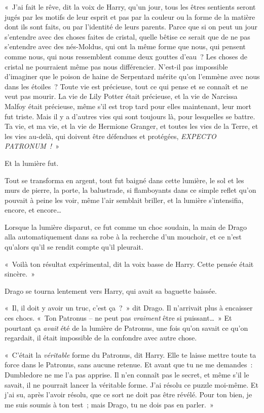 «~J'ai fait le rêve, dit la voix de Harry, qu'un jour, tous les êtres sentients\footnotemark{} seront jugés par les motifs de leur esprit et pas par la couleur ou la forme de la matière dont ils sont faits, ou par l'identité de leurs parents.
Parce que si on peut un jour s'entendre avec des choses faites de cristal, quelle bêtise ce serait que de ne pas s'entendre avec des nés-Moldus, qui ont la même forme que nous, qui pensent comme nous, qui nous ressemblent comme deux gouttes d'eau~?
Les choses de cristal ne pourraient même pas nous différencier.
N'est-il pas impossible d'imaginer que le poison de haine de Serpentard mérite qu'on l'emmène avec nous dans les étoiles~?
Toute vie est précieuse, tout ce qui pense et se connaît et ne veut pas mourir.
La vie de Lily Potter était précieuse, et la vie de Narcissa Malfoy était précieuse, même s'il est trop tard pour elles maintenant, leur mort fut triste.
Mais il y a d'autres vies qui sont toujours là, pour lesquelles se battre.
Ta vie, et ma vie, et la vie de Hermione Granger, et toutes les vies de la Terre, et les vies au-delà, qui doivent être défendues et protégées, \emph{EXPECTO PATRONUM~!}~»

Et la lumière fut.

Tout se transforma en argent, tout fut baigné dans cette lumière, le sol et les murs de pierre, la porte, la balustrade, si flamboyants dans ce simple reflet qu'on pouvait à peine les voir, même l'air semblait briller, et la lumière s'intensifia, encore, et encore…

Lorsque la lumière disparut, ce fut comme un choc soudain, la main de Drago alla automatiquement dans sa robe à la recherche d'un mouchoir, et ce n'est qu'alors qu'il se rendit compte qu'il pleurait.

«~Voilà ton résultat expérimental, dit la voix basse de Harry.
Cette pensée était sincère.~»

Drago se tourna lentement vers Harry, qui avait sa baguette baissée.

«~Il, il doit y avoir un truc, c'est ça~?~»
dit Drago.
Il n'arrivait plus à encaisser ces chocs.
«~Ton Patronus -- ne peut pas \emph{vraiment} être si puissant…~»
Et pourtant ça \emph{avait} été de la lumière de Patronus, une fois qu'on savait ce qu'on regardait, il était impossible de la confondre avec autre chose.

«~C'était la \emph{véritable} forme du Patronus, dit Harry.
Elle te laisse mettre toute ta force dans le Patronus, sans aucune retenue.
Et avant que tu ne me demandes~: Dumbledore ne me l'a pas apprise.
Il n'en connaît pas le secret, et même s'il le savait, il ne pourrait lancer la véritable forme.
J'ai résolu ce puzzle moi-même.
Et j'ai su, après l'avoir résolu, que ce sort ne doit pas être révélé.
Pour ton bien, je me suis soumis à ton test~; mais Drago, tu ne dois pas en parler.~»

